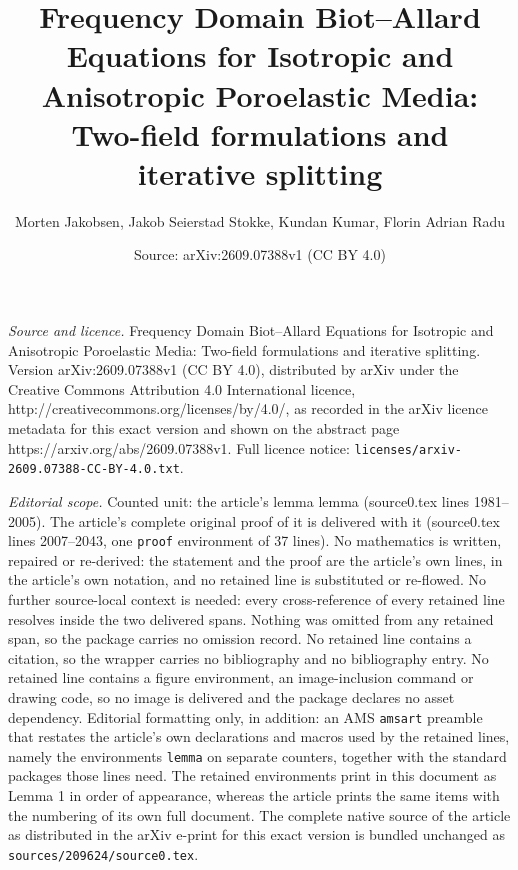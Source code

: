\documentclass[10pt,a4paper]{amsart}
\title{Frequency Domain Biot--Allard Equations for Isotropic and Anisotropic Poroelastic Media: Two-field formulations and iterative splitting}
\author{Morten Jakobsen, Jakob Seierstad Stokke, Kundan Kumar, Florin Adrian Radu}
\date{Source: arXiv:2609.07388v1 (CC BY 4.0)}
\begin{document}
\maketitle

\noindent\emph{Source and licence.} Frequency Domain Biot--Allard Equations for Isotropic and Anisotropic Poroelastic Media: Two-field formulations and iterative splitting. Version arXiv:2609.07388v1 (CC BY 4.0), distributed by arXiv under the Creative Commons Attribution 4.0 International licence, http://creativecommons.org/licenses/by/4.0/, as recorded in the arXiv licence metadata for this exact version and shown on the abstract page https://arxiv.org/abs/2609.07388v1. Full licence notice: \texttt{licenses/arxiv-2609.07388-CC-BY-4.0.txt}.\par\smallskip

\noindent\textit{Editorial scope.} Counted unit: the article's lemma lemma (source0.tex lines 1981--2005). The article's complete original proof of it is delivered with it (source0.tex lines 2007--2043, one \texttt{proof} environment of 37 lines). No mathematics is written, repaired or re-derived: the statement and the proof are the article's own lines, in the article's own notation, and no retained line is substituted or re-flowed.  No further source-local context is needed: every cross-reference of every retained line resolves inside the two delivered spans.  Nothing was omitted from any retained span, so the package carries no omission record.  No retained line contains a citation, so the wrapper carries no bibliography and no bibliography entry.  No retained line contains a figure environment, an image-inclusion command or drawing code, so no image is delivered and the package declares no asset dependency.  Editorial formatting only, in addition: an AMS \texttt{amsart} preamble that restates the article's own declarations and macros used by the retained lines, namely the environments \texttt{lemma} on separate counters, together with the standard packages those lines need.  The retained environments print in this document as Lemma 1 in order of appearance, whereas the article prints the same items with the numbering of its own full document.  The complete native source of the article as distributed in the arXiv e-print for this exact version is bundled unchanged as \texttt{sources/209624/source0.tex}.
\end{document}
